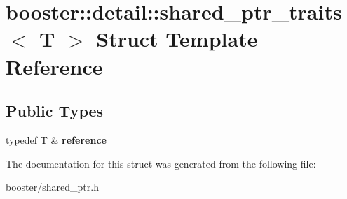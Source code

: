 \section{booster\+:\+:detail\+:\+:shared\+\_\+ptr\+\_\+traits$<$ T $>$ Struct Template Reference}
\label{structbooster_1_1detail_1_1shared__ptr__traits}
\subsection*{Public Types}
\begin{DoxyCompactItemize}
\item 
typedef T \& {\bfseries reference}\label{structbooster_1_1detail_1_1shared__ptr__traits_a74ce07cf17d9ca8b9f09dcd2e9b7ca28}

\end{DoxyCompactItemize}


The documentation for this struct was generated from the following file\+:\begin{DoxyCompactItemize}
\item 
booster/shared\+\_\+ptr.\+h\end{DoxyCompactItemize}
